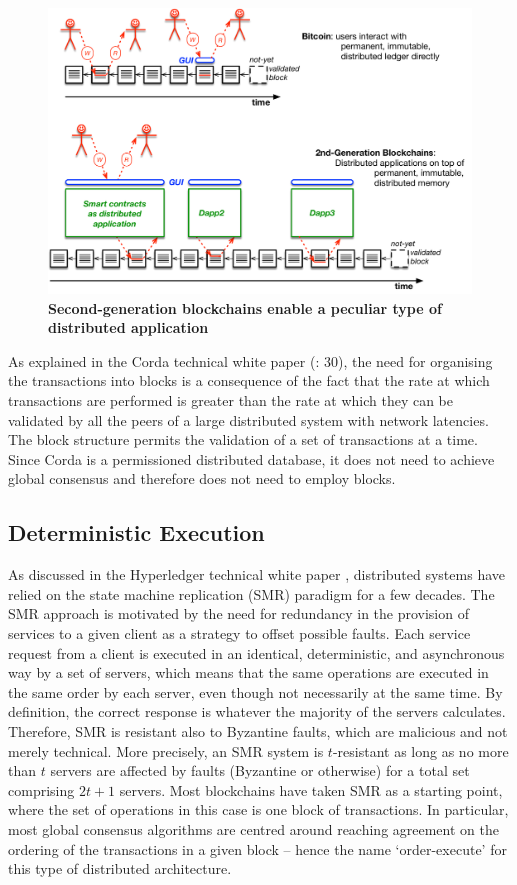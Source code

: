 \begin{figure}[h]
\centering
\includegraphics[width=17 cm]{Figures/dapps}
\caption{\bf \small Second-generation blockchains enable a peculiar type of distributed application}
\label{fig:dapps}
\end{figure}

As explained in the Corda technical white paper (\cite{Hearn2016}: 30), the need for organising the transactions into blocks is a consequence of the fact that the rate at which transactions are performed is greater than the rate at which they can be validated by all the peers of a large distributed system with network latencies. The block structure permits the validation of a set of transactions at a time. Since Corda is a permissioned distributed database, it does not need to achieve global consensus and therefore does not need to employ blocks.

\subsection{Deterministic Execution}
As discussed in the Hyperledger technical white paper \cite{AndroulakiEtAl2018}, distributed systems have relied on the state machine replication (SMR) paradigm \cite{Schneider1990} for a few decades. The SMR approach is motivated by the need for redundancy in the provision of services to a given client as a strategy to offset possible faults. Each service request from a client is executed in an identical, deterministic, and asynchronous way by a set of servers, which means that the same operations are executed in the same order by each server, even though not necessarily at the same time. By definition, the correct response is whatever the majority of the servers calculates. Therefore, SMR is resistant also to Byzantine faults, which are malicious and not merely technical. More precisely, an SMR system is $t$-resistant as long as no more than $t$ servers are affected by faults (Byzantine or otherwise) for a total set comprising $2t + 1$ servers. Most blockchains have taken SMR as a starting point, where the set of operations in this case is one block of transactions. In particular, most global consensus algorithms are centred around reaching agreement on the ordering of the transactions in a given block -- hence the name `order-execute' for this type of distributed architecture.

